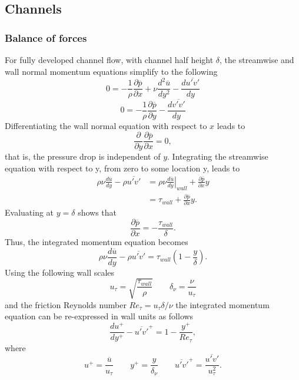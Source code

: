 \documentclass[oneside,a4paper,11pt]{report}
\newcommand{\pavg}{\overline{p}}
\newcommand{\uavg}{\overline{u}}
\newcommand{\ufluc}{u'}
\newcommand{\vfluc}{v'}
\begin{document}
\subsection{Channels}

\subsubsection{Balance of forces}

For fully developed channel flow, with channel half height $\delta$, the streamwise and wall normal momentum equations simplify to the following
\begin{equation}
0 = -\frac{1}{\rho}\frac{\partial \pavg}{\partial x} + \nu \frac{d^2 \uavg}{d y^2} - \frac{ d \overline{\ufluc \vfluc} }{d y}
\end{equation}
\begin{equation}
0 = -\frac{1}{\rho}\frac{\partial \pavg}{\partial y} - \frac{d \overline{\vfluc \vfluc} }{d y}
\end{equation}
Differentiating the wall normal equation with respect to $x$ leads to
\begin{equation}
\frac{\partial}{\partial y} \frac{\partial \pavg}{\partial x} = 0,
\end{equation}
that is, the pressure drop is independent of $y$. Integrating the streamwise equation with respect to y, from zero to some location y, leads to
\begin{align}
\rho \nu \frac{d \uavg}{d y} - \rho \overline{\ufluc \vfluc} &= \left . \rho \nu \frac{d \uavg}{d y} \right |_{wall} + \frac{\partial \pavg}{\partial x} y \nonumber \\
& = \tau_{wall} + \frac{\partial \pavg}{\partial x} y.
\end{align}
Evaluating at $y = \delta$ shows that
\begin{equation}
\frac{\partial \pavg}{\partial x} = -\frac{\tau_{wall}}{\delta}.
\end{equation}
Thus, the integrated momentum equation becomes
\begin{equation}
\rho \nu \frac{d \uavg}{d y} - \rho \overline{\ufluc \vfluc} = \tau_{wall} \left ( 1 - \frac{y}{\delta} \right ).
\end{equation}
Using the following wall scales
\begin{equation}
u_\tau = \sqrt{\frac{\tau_{wall}}{\rho}} \qquad \delta_\nu = \frac{\nu}{u_\tau} 
\end{equation}
and the friction Reynolds number $Re_\tau = u_\tau \delta/\nu$ the integrated momentum equation can be re-expressed in wall units as follows
\begin{equation}
\frac{du^+}{dy^+} - \overline{\ufluc \vfluc}^+ = 1 - \frac{y^+}{Re_\tau},
\end{equation}
where 
\begin{equation}
    u^+ = \frac{\uavg}{u_\tau} \qquad y^+ = \frac{y}{\delta_{\nu}} \qquad \overline{\ufluc \vfluc}^+ = \frac{\overline{\ufluc \vfluc}}{u_\tau^2}.
\end{equation}
\end{document}
